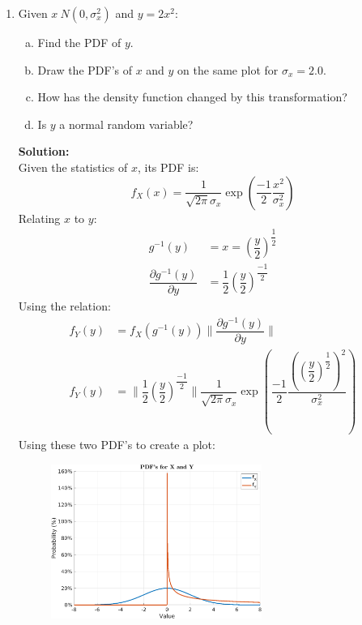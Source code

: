 \documentclass[11pt]{article}
\newcommand{\solution}{\textbf{Solution: \\}}
\begin{document}
\begin{enumerate}[label=\textbf{\arabic*.}]
  \item Given $x ~ N(0,\sigma_x^2)$ and $y=2x^2$:
  \begin{enumerate}[(a)]
    \itemsep -2pt
    \item Find the PDF of $y$.
    \item Draw the PDF's of $x$ and $y$ on the same plot for $\sigma_x=2.0$.
    \item How has the density function changed by this transformation?
    \item Is $y$ a normal random variable?
  \end{enumerate}
  \solution
  Given the statistics of $x$, its PDF is:
  \begin{equation*}
    f_X(x) = \dfrac{1}{\sqrt{2\pi}\sigma_x}\exp{\left(\dfrac{-1}{2}\dfrac{x^2}{\sigma_x^2}\right)}
  \end{equation*} 
  Relating $x$ to $y$:
  \begin{equation*}
    \begin{split}
      g^{-1}(y) &= x = \left(\dfrac{y}{2}\right)^{\dfrac{1}{2}} \\
      \dfrac{\partial g^{-1}(y)}{\partial y} &= \dfrac{1}{2} \left(\dfrac{y}{2}\right)^{\dfrac{-1}{2}}
    \end{split}
  \end{equation*}
  Using the relation:
  \begin{equation*}
    \begin{split}
      f_Y(y) &= f_X(g^{-1}(y)) \biggr\rVert \dfrac{\partial g^{-1}(y)}{\partial y} \biggr\rVert \\
      f_Y(y) &= \biggr\rVert \dfrac{1}{2} \left(\dfrac{y}{2}\right)^{\dfrac{-1}{2}} \biggr\rVert 
                \dfrac{1}{\sqrt{2\pi}\sigma_x}
                \exp{\left(\dfrac{-1}{2}\dfrac{\left(\left(\dfrac{y}{2}\right)^{\dfrac{1}{2}}\right)^2}{\sigma_x^2}\right)}
    \end{split}
  \end{equation*}
  Using these two PDF's to create a plot:
  \begin{figure}[H]
    \centering
    \includegraphics[width=0.65\textwidth]{p7.png}

\end{figure}
\end{enumerate}
\end{document}
